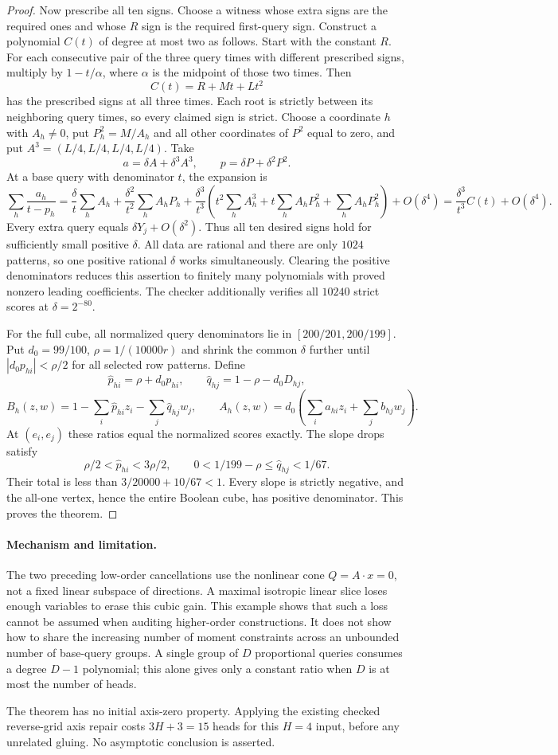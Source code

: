 \documentclass[11pt]{article}
\begin{document}
\begin{proof}
Now prescribe all ten signs. Choose a witness whose extra signs are
the required ones and whose $R$ sign is the required first-query sign.
Construct a polynomial $C(t)$ of degree at most two as follows. Start
with the constant $R$. For each consecutive pair of the three query
times with different prescribed signs, multiply by $1-t/\alpha$, where
$\alpha$ is the midpoint of those two times. Then
\[
 C(t)=R+Mt+Lt^2
\]
has the prescribed signs at all three times. Each root is strictly
between its neighboring query times, so every claimed sign is strict.
Choose a coordinate $h$ with $A_h\ne0$, put $P^2_h=M/A_h$ and all
other coordinates of $P^2$ equal to zero, and put
$A^3=(L/4,L/4,L/4,L/4)$. Take
\[
 a=\delta A+\delta^3 A^3,\qquad
 p=\delta P+\delta^2 P^2.
\]
At a base query with denominator $t$, the expansion is
\[
 \sum_h\frac{a_h}{t-p_h}
 =\frac{\delta}{t}\sum_hA_h
 +\frac{\delta^2}{t^2}\sum_hA_hP_h
 +\frac{\delta^3}{t^3}
 \left(t^2\sum_h A^3_h+t\sum_h A_hP^2_h+
       \sum_h A_hP_h^2\right)+O(\delta^4)
 =\frac{\delta^3}{t^3}C(t)+O(\delta^4).
\]
Every extra query equals $\delta Y_j+O(\delta^2)$. Thus all ten
desired signs hold for sufficiently small positive $\delta$.
All data are rational and there are only $1024$ patterns, so one
positive rational $\delta$ works simultaneously. Clearing the positive
denominators reduces this assertion to finitely many polynomials with
proved nonzero leading coefficients. The checker additionally verifies
all $10240$ strict scores at $\delta=2^{-80}$.

For the full cube, all normalized query denominators lie in
$[200/201,200/199]$. Put $d_0=99/100$, $\rho=1/(10000r)$ and shrink
the common $\delta$ further until $|d_0p_{hi}|<\rho/2$ for all selected
row patterns. Define
\[
 \widehat p_{hi}=\rho+d_0p_{hi},\qquad
 \widehat q_{hj}=1-\rho-d_0D_{hj},
\]
\[
 B_h(z,w)=1-\sum_i\widehat p_{hi}z_i-\sum_j\widehat q_{hj}w_j,
 \qquad
 A_h(z,w)=d_0\left(\sum_i a_{hi}z_i+\sum_jb_{hj}w_j\right).
\]
At $(e_i,e_j)$ these ratios equal the normalized scores exactly.
The slope drops satisfy
\[
 \rho/2<\widehat p_{hi}<3\rho/2,
 \qquad 0<1/199-\rho\leq\widehat q_{hj}<1/67.
\]
Their total is less than $3/20000+10/67<1$. Every slope is strictly
negative, and the all-one vertex, hence the entire Boolean cube, has
positive denominator. This proves the theorem.
\end{proof}

\paragraph{Mechanism and limitation.}
The two preceding low-order cancellations use the nonlinear cone
$Q=A\cdot x=0$, not a fixed linear subspace of directions. A maximal
isotropic linear slice loses enough variables to erase this cubic gain.
This example shows that such a loss cannot be assumed when auditing
higher-order constructions. It does not show how to share the increasing
number of moment constraints across an unbounded number of base-query
groups. A single group of $D$ proportional queries consumes a degree
$D-1$ polynomial; this alone gives only a constant ratio when $D$ is at
most the number of heads.

The theorem has no initial axis-zero property. Applying the existing
checked reverse-grid axis repair costs $3H+3=15$ heads for this $H=4$
input, before any unrelated gluing. No asymptotic conclusion is asserted.
\end{document}
